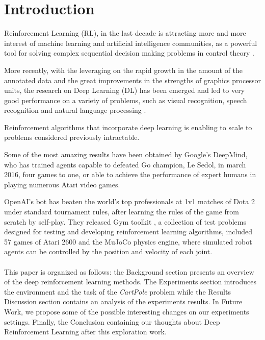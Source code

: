 \section{Introduction}

Reinforcement Learning (RL), in the last decade is attracting more and more interest of machine learning and artificial intelligence communities, as a powerful tool for solving complex sequential decision making problems in control theory \cite{GosaviRLSurvey}.

More recently, with the leveraging on the rapid growth in the amount of the annotated data and the great improvements in the strengths of graphics processor units, the research on  Deep Learning (DL) has been emerged and led to very good performance on a variety of problems, such as visual recognition, speech recognition and natural language processing \cite{AdvancesCNN}.

Reinforcement algorithms that incorporate deep learning is enabling to scale to problems considered previously intractable.

Some of the most amazing results have been obtained by Google’s DeepMind, who has trained agents capable to defeated Go champion, Le Sedol, in march 2016, four games to one, or able to achieve the performance of expert humans in playing numerous Atari video games.

OpenAI's bot has beaten the world's top professionals at 1v1 matches of Dota 2 under standard tournament rules, after learning the rules of the game from scratch by self-play.
They released Gym toolkit \cite{Gym}, a collection of test problems designed for testing and developing reinforcement learning algorithms, included 57 games of Atari 2600 and the MuJoCo physics engine, where simulated robot agents can be controlled by the position and velocity of each joint. 
\\\\
This paper is organized as follows: the Background section presents an overview of the deep reinforcement learning methods. The Experiments section introduces the environment and the task of the \textit{CartPole} problem while the Results Discussion section contains an analysis of the experiments results. In Future Work, we propose some of the possible interesting changes on our experiments settings. Finally, the Conclusion containing our thoughts about Deep Reinforcement Learning after this exploration work.
